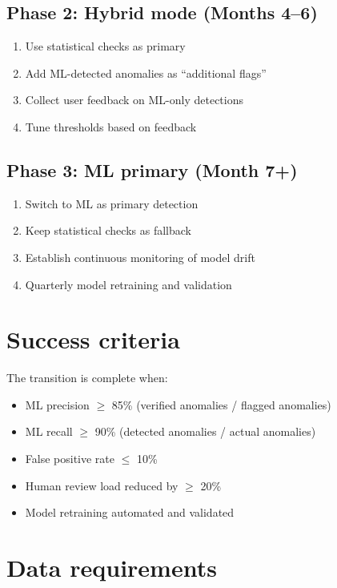 \documentclass[11pt,a4paper,twoside]{report}
\begin{document}
\subsection{Phase 2: Hybrid mode (Months 4--6)}

\begin{enumerate}
\item Use statistical checks as primary
\item Add ML-detected anomalies as ``additional flags''
\item Collect user feedback on ML-only detections
\item Tune thresholds based on feedback
\end{enumerate}

\subsection{Phase 3: ML primary (Month 7+)}

\begin{enumerate}
\item Switch to ML as primary detection
\item Keep statistical checks as fallback
\item Establish continuous monitoring of model drift
\item Quarterly model retraining and validation
\end{enumerate}

\section{Success criteria}

The transition is complete when:
\begin{itemize}
\item ML precision $\geq$ 85\% (verified anomalies / flagged anomalies)
\item ML recall $\geq$ 90\% (detected anomalies / actual anomalies)
\item False positive rate $\leq$ 10\%
\item Human review load reduced by $\geq$ 20\%
\item Model retraining automated and validated
\end{itemize}

\section{Data requirements}
\end{document}
